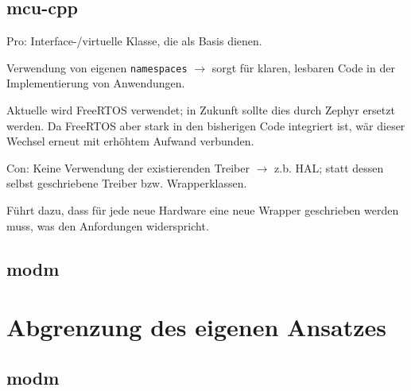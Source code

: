 \subsection{mcu-cpp}
Pro:
Interface-/virtuelle Klasse, die als Basis dienen.

Verwendung von eigenen \texttt{namespaces} $\rightarrow$ sorgt für klaren, lesbaren Code in der Implementierung von Anwendungen.

Aktuelle wird FreeRTOS verwendet; in Zukunft sollte dies durch Zephyr ersetzt werden.
Da FreeRTOS aber stark in den bisherigen Code integriert ist, wär dieser Wechsel erneut mit erhöhtem Aufwand verbunden.



Con:
Keine Verwendung der existierenden Treiber $\rightarrow$ z.b. HAL; statt dessen selbst geschriebene Treiber bzw. Wrapperklassen.

Führt dazu, dass für jede neue Hardware eine neue Wrapper geschrieben werden muss, was den Anfordungen widerspricht.

\subsection{modm}


\section{Abgrenzung des eigenen Ansatzes}
\subsection{modm}


